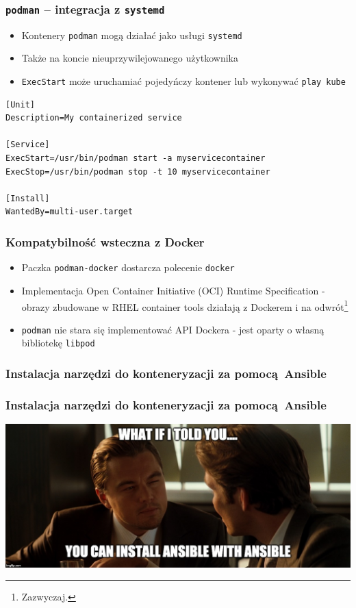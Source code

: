 \documentclass[dvipsnames,table]{beamer}
\begin{document}
\begin{frame}[fragile]
	\frametitle{{\tt podman} -- integracja z {\tt systemd}}
	\begin{itemize}
		\item Kontenery {\tt podman} mogą działać jako usługi {\tt systemd}
		\item Także na koncie nieuprzywilejowanego użytkownika
		\item {\tt ExecStart} może uruchamiać pojedyńczy kontener lub wykonywać {\tt play kube}
	\end{itemize}
\begin{lstlisting}[style=cfg]
[Unit]
Description=My containerized service

[Service]
ExecStart=/usr/bin/podman start -a myservicecontainer 
ExecStop=/usr/bin/podman stop -t 10 myservicecontainer 

[Install]
WantedBy=multi-user.target
\end{lstlisting}
\end{frame}

\begin{frame}
	\frametitle{Kompatybilność wsteczna z Docker}
	\begin{itemize}
		\item Paczka {\tt podman-docker} dostarcza polecenie {\tt docker}
		\item Implementacja Open Container Initiative (OCI) Runtime Specification - obrazy zbudowane w RHEL container tools działają z Dockerem i na odwrót\footnote{Zazwyczaj.}
		\item {\tt podman} nie stara się implementować API Dockera - jest oparty o własną bibliotekę {\tt libpod}
	\end{itemize}
\end{frame}

\begin{frame}[fragile]
	\frametitle{Instalacja narzędzi do konteneryzacji za pomocą Ansible}
	
\end{frame}

\begin{frame}[fragile]
	\frametitle{Instalacja narzędzi do konteneryzacji za pomocą Ansible}
\begin{center}
\includegraphics[scale=0.13]{img-ansibleinception.jpg}
\end{center}

\end{frame}
\end{document}

